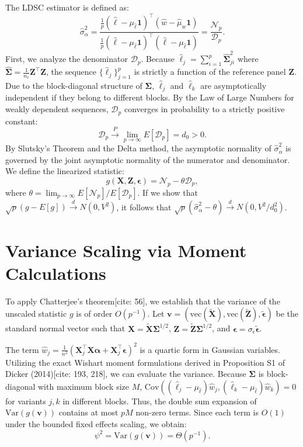 \documentclass{article}
\newcommand{\X}{\mathbf{X}}
\newcommand{\Z}{\mathbf{Z}}
\newcommand{\1}{\mathbf{1}}
\newcommand{\bmSigma}{\boldsymbol{\Sigma}}
\newcommand{\bmalpha}{\boldsymbol{\alpha}}
\newcommand{\bmeps}{\boldsymbol{\epsilon}}
\newcommand{\Var}{\mathrm{Var}}
\newcommand{\Cov}{\mathrm{Cov}}
\begin{document}
The LDSC estimator is defined as:
\[
\hat\sigma_\alpha^2 = \frac{\frac{1}{p}(\hat\ell-\mu_{\hat\ell}\1)^\top(\hat w-\hat\mu_{w}\1)}{\frac{1}{p}(\hat\ell-\mu_{\hat\ell}\1)^\top(\hat\ell-\mu_{\hat\ell}\1)} = \frac{\mathcal{N}_p}{\mathcal{D}_p}.
\]
First, we analyze the denominator $\mathcal{D}_p$. Because $\hat\ell_j = \sum_{i=1}^p \widehat{\bmSigma}_{ji}^2$ where $\widehat{\bmSigma} = \frac{1}{n_r} \Z^\top \Z$, the sequence $\{\hat\ell_j\}_{j=1}^p$ is strictly a function of the reference panel $\Z$. Due to the block-diagonal structure of $\bmSigma$, $\hat\ell_j$ and $\hat\ell_k$ are asymptotically independent if they belong to different blocks. By the Law of Large Numbers for weakly dependent sequences, $\mathcal{D}_p$ converges in probability to a strictly positive constant:
\[
\mathcal{D}_p \xrightarrow{P} \lim_{p \to \infty} E[\mathcal{D}_p] = d_0 > 0.
\]
By Slutsky's Theorem and the Delta method, the asymptotic normality of $\hat\sigma_\alpha^2$ is governed by the joint asymptotic normality of the numerator and denominator. We define the linearized statistic:
\[
g(\X, \Z, \bmeps) = \mathcal{N}_p - \theta \mathcal{D}_p,
\]
where $\theta = \lim_{p \to \infty} E[\mathcal{N}_p] / E[\mathcal{D}_p]$. If we show that $\sqrt{p}(g - E[g]) \xrightarrow{d} N(0, V^2)$, it follows that $\sqrt{p}(\hat\sigma_\alpha^2 - \theta) \xrightarrow{d} N(0, V^2 / d_0^2)$.

\section{Variance Scaling via Moment Calculations}

To apply Chatterjee's theorem[cite: 56], we establish that the variance of the unscaled statistic $g$ is of order $O(p^{-1})$. Let $\mathbf{v} = (\mathrm{vec}(\tilde{\X}), \mathrm{vec}(\tilde{\Z}), \tilde{\bmeps})$ be the standard normal vector such that $\X = \tilde{\X}\bmSigma^{1/2}$, $\Z = \tilde{\Z}\bmSigma^{1/2}$, and $\bmeps = \sigma_\epsilon \tilde{\bmeps}$.

The term $\hat{w}_j = \frac{1}{n^2}(\X_j^\top \X \bmalpha + \X_j^\top \bmeps)^2$ is a quartic form in Gaussian variables. Utilizing the exact Wishart moment formulations derived in Proposition S1 of Dicker (2014)[cite: 193, 218], we can evaluate the variance. Because $\bmSigma$ is block-diagonal with maximum block size $M$, $\Cov((\hat\ell_j - \mu_{\hat\ell})\hat{w}_j, (\hat\ell_k - \mu_{\hat\ell})\hat{w}_k) = 0$ for variants $j, k$ in different blocks. Thus, the double sum expansion of $\Var(g(\mathbf{v}))$ contains at most $pM$ non-zero terms. Since each term is $O(1)$ under the bounded fixed effects scaling, we obtain:
\[
\psi^2 = \Var(g(\mathbf{v})) = \Theta(p^{-1}).
\]
\end{document}

